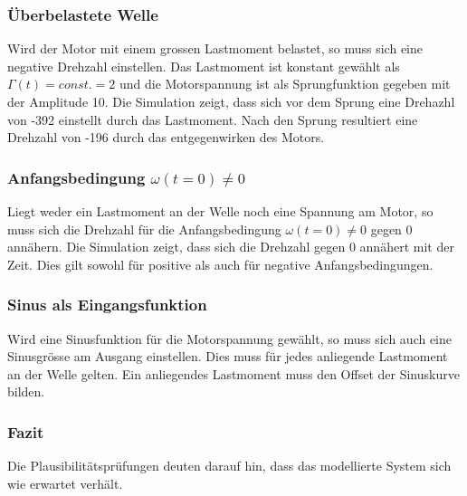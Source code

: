 \subsubsection{Überbelastete Welle}
Wird der Motor mit einem grossen Lastmoment belastet, so muss sich eine
negative Drehzahl einstellen. Das Lastmoment ist konstant gewählt als
$\Gamma(t) = const. = 2$ und die Motorspannung ist als Sprungfunktion
gegeben mit der Amplitude 10. Die Simulation zeigt, dass sich vor dem Sprung
eine Drehazhl von -392 einstellt durch das Lastmoment. Nach den Sprung
resultiert eine Drehzahl von -196 durch das entgegenwirken des Motors.

\subsubsection{Anfangsbedingung $\omega(t=0) \neq 0$}
Liegt weder ein Lastmoment an der Welle noch eine Spannung am Motor, so muss
sich die Drehzahl für die Anfangsbedingung $\omega(t=0) \neq 0$ gegen 0
annähern. Die Simulation zeigt, dass sich die Drehzahl gegen 0 annähert mit
der Zeit. Dies gilt sowohl für positive als auch für negative
Anfangsbedingungen.

\subsubsection{Sinus als Eingangsfunktion}
Wird eine Sinusfunktion für die Motorspannung gewählt, so muss sich auch
eine Sinusgrösse am Ausgang einstellen. Dies muss für jedes anliegende
Lastmoment an der Welle gelten. Ein anliegendes Lastmoment muss den Offset
der Sinuskurve bilden.

\subsubsection{Fazit}
Die Plausibilitätsprüfungen deuten darauf hin, dass das modellierte System
sich wie erwartet verhält.
